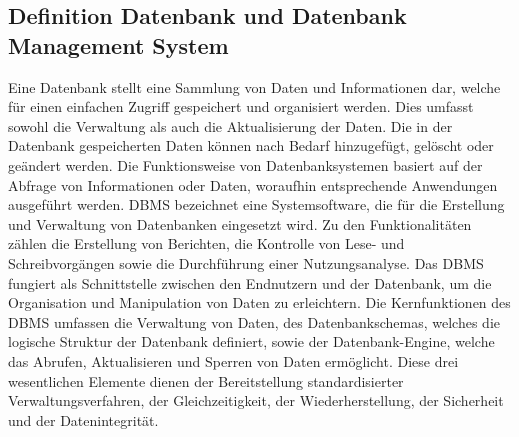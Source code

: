 \subsection{Definition Datenbank und Datenbank Management System} %
\label{sec:definitiondatenbank}
Eine Datenbank stellt eine Sammlung von Daten und Informationen dar, welche für einen einfachen Zugriff gespeichert und organisiert werden. Dies umfasst sowohl die Verwaltung als auch die Aktualisierung der Daten. Die in der Datenbank gespeicherten Daten können nach Bedarf hinzugefügt, gelöscht oder geändert werden. Die Funktionsweise von Datenbanksystemen basiert auf der Abfrage von Informationen oder Daten, woraufhin entsprechende Anwendungen ausgeführt werden. DBMS bezeichnet eine Systemsoftware, die für die Erstellung und Verwaltung von Datenbanken eingesetzt wird. Zu den Funktionalitäten zählen die Erstellung von Berichten, die Kontrolle von Lese- und Schreibvorgängen sowie die Durchführung einer Nutzungsanalyse. Das DBMS fungiert als Schnittstelle zwischen den Endnutzern und der Datenbank, um die Organisation und Manipulation von Daten zu erleichtern. Die Kernfunktionen des DBMS umfassen die Verwaltung von Daten, des Datenbankschemas, welches die logische Struktur der Datenbank definiert, sowie der Datenbank-Engine, welche das Abrufen, Aktualisieren und Sperren von Daten ermöglicht. Diese drei wesentlichen Elemente dienen der Bereitstellung standardisierter Verwaltungsverfahren, der Gleichzeitigkeit, der Wiederherstellung, der Sicherheit und der Datenintegrität. \citep{9677042}


